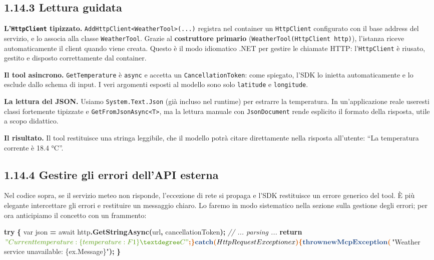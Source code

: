 \documentclass[
  italian,
  10pt,
]{book}
\newenvironment{Shaded}{\begin{snugshade}}{\end{snugshade}}
\newcommand{\CommentTok}[1]{\textcolor[rgb]{0.56,0.35,0.01}{\textit{#1}}}
\newcommand{\DataTypeTok}[1]{\textcolor[rgb]{0.13,0.29,0.53}{#1}}
\newcommand{\FunctionTok}[1]{\textcolor[rgb]{0.13,0.29,0.53}{\textbf{#1}}}
\newcommand{\KeywordTok}[1]{\textcolor[rgb]{0.13,0.29,0.53}{\textbf{#1}}}
\newcommand{\NormalTok}[1]{#1}
\newcommand{\OperatorTok}[1]{\textcolor[rgb]{0.81,0.36,0.00}{\textbf{#1}}}
\newcommand{\StringTok}[1]{\textcolor[rgb]{0.31,0.60,0.02}{#1}}
\begin{document}
\subsection{1.14.3 Lettura guidata}\label{lettura-guidata-1}

\textbf{L'\texttt{HttpClient} tipizzato.}
\texttt{AddHttpClient\textless{}WeatherTool\textgreater{}(...)} registra
nel container un \texttt{HttpClient} configurato con il base address del
servizio, e lo associa alla classe \texttt{WeatherTool}. Grazie al
\textbf{costruttore primario} (\texttt{WeatherTool(HttpClient\ http)}),
l'istanza riceve automaticamente il client quando viene creata. Questo è
il modo idiomatico .NET per gestire le chiamate HTTP:
l'\texttt{HttpClient} è riusato, gestito e disposto correttamente dal
container.

\textbf{Il tool asincrono.} \texttt{GetTemperature} è \texttt{async} e
accetta un \texttt{CancellationToken}: come spiegato, l'SDK lo inietta
automaticamente e lo esclude dallo schema di input. I veri argomenti
esposti al modello sono solo \texttt{latitude} e \texttt{longitude}.

\textbf{La lettura del JSON.} Usiamo \texttt{System.Text.Json} (già
incluso nel runtime) per estrarre la temperatura. In un'applicazione
reale useresti classi fortemente tipizzate e
\texttt{GetFromJsonAsync\textless{}T\textgreater{}}, ma la lettura
manuale con \texttt{JsonDocument} rende esplicito il formato della
risposta, utile a scopo didattico.

\textbf{Il risultato.} Il tool restituisce una stringa leggibile, che il
modello potrà citare direttamente nella risposta all'utente: ``La
temperatura corrente è 18.4 °C''.

\subsection{1.14.4 Gestire gli errori dell'API
esterna}\label{gestire-gli-errori-dellapi-esterna}

Nel codice sopra, se il servizio meteo non risponde, l'eccezione di rete
si propaga e l'SDK restituisce un errore generico del tool. È più
elegante intercettare gli errori e restituire un messaggio chiaro. Lo
faremo in modo sistematico nella sezione sulla gestione degli errori;
per ora anticipiamo il concetto con un frammento:

\begin{Shaded}
\begin{Highlighting}[]
\KeywordTok{try}
\OperatorTok{\{}
    \DataTypeTok{var}\NormalTok{ json }\OperatorTok{=}\NormalTok{ await http}\OperatorTok{.}\FunctionTok{GetStringAsync}\OperatorTok{(}\NormalTok{url}\OperatorTok{,}\NormalTok{ cancellationToken}\OperatorTok{);}
    \CommentTok{// ... parsing ...}
    \KeywordTok{return}\NormalTok{ $}\StringTok{"Current temperature: \{temperature:F1\} °C"}\OperatorTok{;}
\OperatorTok{\}}
\KeywordTok{catch} \OperatorTok{(}\NormalTok{HttpRequestException ex}\OperatorTok{)}
\OperatorTok{\{}
    \KeywordTok{throw} \KeywordTok{new} \FunctionTok{McpException}\OperatorTok{(}\NormalTok{$}\StringTok{"Weather service unavailable: \{ex.Message\}"}\OperatorTok{);}
\OperatorTok{\}}
\end{Highlighting}
\end{Shaded}
\end{document}
